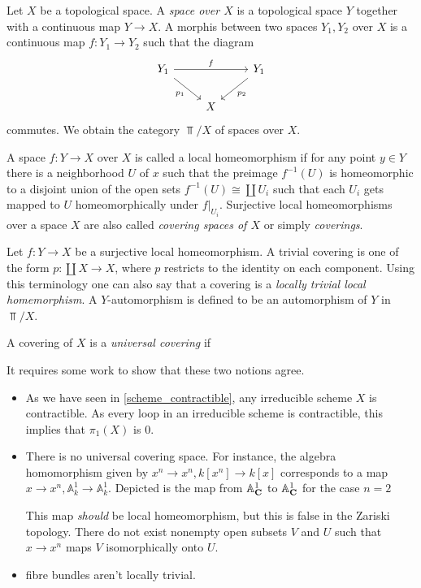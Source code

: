 \begin{construction}
    \begin{definition}
        Let $X$ be a topological space. A \textit{space over $X$ } is a topological space $Y$ together with a continuous map $Y \to X$. A morphis between two spaces $Y_1, Y_2$ over $X$ is a continuous map $f: Y_1 \to Y_2$ such that the diagram
        \[
        \begin{tikzcd}
        	{Y_1} && {Y_1} \\
        	& X
        	\arrow["f", from=1-1, to=1-3]
        	\arrow["{p_2}", from=1-3, to=2-2]
        	\arrow["{p_1}"', from=1-1, to=2-2]
        \end{tikzcd}
        \]
        commutes. We obtain the category $\Top/X$ of spaces over $X$.
    \end{definition}
    \begin{definition}
        A space $f: Y \to X$ over $X$ is called a local homeomorphism if for any point $y \in Y$ there is a neighborhood $U$ of $x$ such that the preimage $f^{-1}(U)$ is homeomorphic to a disjoint union of the open sets $f^{-1}(U) \cong \coprod U_i$ such that each $U_i$ gets mapped to $U$ homeomorphically under $f|_{U_i}$. Surjective local homeomorphisms over a space $X$ are also called \textit{covering spaces of $X$} or simply \textit{coverings}.
    \end{definition}
Let $f: Y \to X$ be a surjective local homeomorphism.  A trivial covering is one of the form $p: \coprod X \to X$, where $p$ restricts to the identity on each component. Using this terminology one can also say that a covering is a \textit{locally trivial local homemorphism}. A $Y$-automorphism is defined to be an automorphism of $Y$ in $\Top/X$. 
\begin{definition}
    A covering of $X$ is a \textit{universal covering} if 
\end{definition}
\end{construction}
It requires some work to show that these two notions agree.


\begin{itemize}
  \item  As we have seen in \ref{scheme_contractible}, any irreducible scheme $X$ is contractible. As every loop in an irreducible scheme is contractible, this implies that $\pi_1(X)$ is $0$.
  \item There is no universal covering space.
        For instance, the algebra homomorphism given by $x^n \to x^n, k[x^n] \to k[x]$ corresponds to a map $x \to x^n, \mathbb{A}^1_k \to \mathbb{A}^1_k$. Depicted is the map from $\mathbb{A}^1_{\mathbf{C}}$ to $\mathbb{A}^1_{\mathbf{C}}$ for the case $n=2$

        
        This map \textit{should} be local homeomorphism, but this is false in the Zariski topology. There do not exist nonempty open subsets $V$ and $U$ such that $x \to x^n$ maps $V$ isomorphically onto $U$.
  \item fibre bundles aren't locally trivial.
\end{itemize}
  
